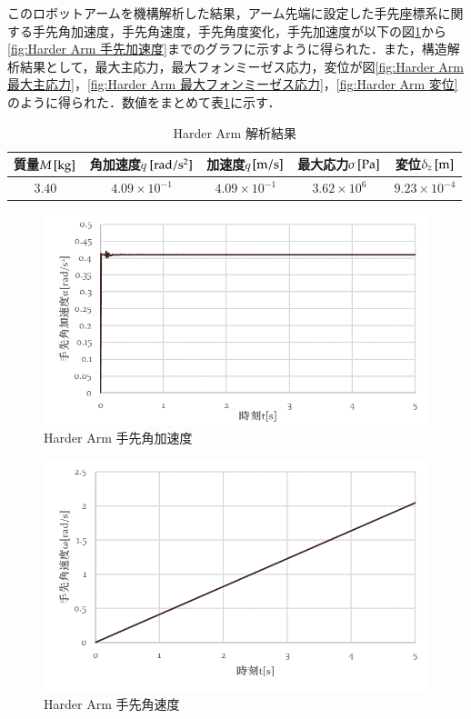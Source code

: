 \documentclass[10pt,b5paper,papersize,dvipdfmx]{jsbook}
\begin{document}
このロボットアームを機構解析した結果，アーム先端に設定した手先座標系に関する手先角加速度，手先角速度，手先角度変化，手先加速度が以下の図\ref{fig:Harder Arm 手先角加速度}から\ref{fig:Harder Arm 手先加速度}までのグラフに示すように得られた．また，構造解析結果として，最大主応力，最大フォンミーゼス応力，変位が図\ref{fig:Harder Arm 最大主応力}，\ref{fig:Harder Arm 最大フォンミーゼス応力}，\ref{fig:Harder Arm 変位} のように得られた．数値をまとめて表\ref{tbl:Harder Arm 解析結果}に示す．
\begin{table}[H]
  \centering
  \caption{Harder Arm 解析結果}
  \label{tbl:Harder Arm 解析結果}
  \begin{tabular}{|c|c|c|c|c|} \hline
    質量$M\tani*{kg}$& 角加速度$\ddot{q}$$\tani*{rad/s^2}$& 加速度$\dot{q}$$\tani*{m/s}$& 最大応力$\sigma\tani*{Pa}$& 変位$\delta_z\tani*{m}$\\ \hline
    $3.40$&$4.09\times 10^{-1}$&$4.09\times 10^{-1}$&$3.62\times 10^6$&$9.23\times 10^{-4}$\\ \hline
  \end{tabular}
\end{table}
%
\begin{figure}[H]
  \centering
  \includegraphics[width=.8\textwidth]{img/robot14.png}
  \caption{Harder Arm 手先角加速度}
  \label{fig:Harder Arm 手先角加速度}
\end{figure}
%
\begin{figure}[H]
  \centering
  \includegraphics[width=.8\textwidth]{img/robot15.png}
  \caption{Harder Arm 手先角速度}
  \label{fig:Harder Arm 手先角速度}
\end{figure}
\end{document}
